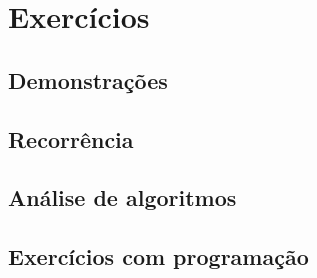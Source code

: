 \chapter*{Exercícios}

\section*{Demonstrações}

\section*{Recorrência}

\section*{Análise de algoritmos}

\section*{Exercícios com programação}
\vspace*{2em}